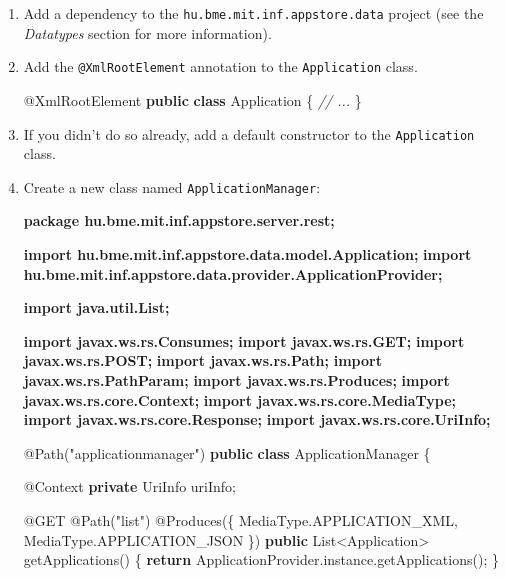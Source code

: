 \documentclass[]{report}
\newenvironment{Shaded}{}{}
\newcommand{\KeywordTok}[1]{\textcolor[rgb]{0.00,0.44,0.13}{\textbf{{#1}}}}
\newcommand{\StringTok}[1]{\textcolor[rgb]{0.25,0.44,0.63}{{#1}}}
\newcommand{\CommentTok}[1]{\textcolor[rgb]{0.38,0.63,0.69}{\textit{{#1}}}}
\newcommand{\FunctionTok}[1]{\textcolor[rgb]{0.02,0.16,0.49}{{#1}}}
\newcommand{\NormalTok}[1]{{#1}}
\begin{document}
\begin{enumerate}
\def\labelenumi{\arabic{enumi}.}
\item
  Add a dependency to the \texttt{hu.bme.mit.inf.appstore.data} project
  (see the \emph{Datatypes} section for more information).
\item
  Add the \texttt{@XmlRootElement} annotation to the
  \texttt{Application} class.

\begin{Shaded}
\begin{Highlighting}[]
\FunctionTok{@XmlRootElement}
\KeywordTok{public} \KeywordTok{class} \NormalTok{Application \{}
  \CommentTok{// ...}
\NormalTok{\}}
\end{Highlighting}
\end{Shaded}
\item
  If you didn't do so already, add a default constructor to the
  \texttt{Application} class.
\item
  Create a new class named \texttt{ApplicationManager}:

\begin{Shaded}
\begin{Highlighting}[]
\KeywordTok{package hu.bme.mit.inf.appstore.server.rest;}

\KeywordTok{import hu.bme.mit.inf.appstore.data.model.Application;}
\KeywordTok{import hu.bme.mit.inf.appstore.data.provider.ApplicationProvider;}

\KeywordTok{import java.util.List;}

\KeywordTok{import javax.ws.rs.Consumes;}
\KeywordTok{import javax.ws.rs.GET;}
\KeywordTok{import javax.ws.rs.POST;}
\KeywordTok{import javax.ws.rs.Path;}
\KeywordTok{import javax.ws.rs.PathParam;}
\KeywordTok{import javax.ws.rs.Produces;}
\KeywordTok{import javax.ws.rs.core.Context;}
\KeywordTok{import javax.ws.rs.core.MediaType;}
\KeywordTok{import javax.ws.rs.core.Response;}
\KeywordTok{import javax.ws.rs.core.UriInfo;}

\FunctionTok{@Path}\NormalTok{(}\StringTok{"applicationmanager"}\NormalTok{)}
\KeywordTok{public} \KeywordTok{class} \NormalTok{ApplicationManager \{}

  \FunctionTok{@Context}
  \KeywordTok{private} \NormalTok{UriInfo uriInfo;}

  \FunctionTok{@GET}
  \FunctionTok{@Path}\NormalTok{(}\StringTok{"list"}\NormalTok{)}
  \FunctionTok{@Produces}\NormalTok{(\{ MediaType.}\FunctionTok{APPLICATION_XML}\NormalTok{, MediaType.}\FunctionTok{APPLICATION_JSON} \NormalTok{\})}
  \KeywordTok{public} \NormalTok{List<Application> }\FunctionTok{getApplications}\NormalTok{() \{}
    \KeywordTok{return} \NormalTok{ApplicationProvider.}\FunctionTok{instance}\NormalTok{.}\FunctionTok{getApplications}\NormalTok{();}
  \NormalTok{\}}


\end{Highlighting}
\end{Shaded}
\end{enumerate}
\end{document}
